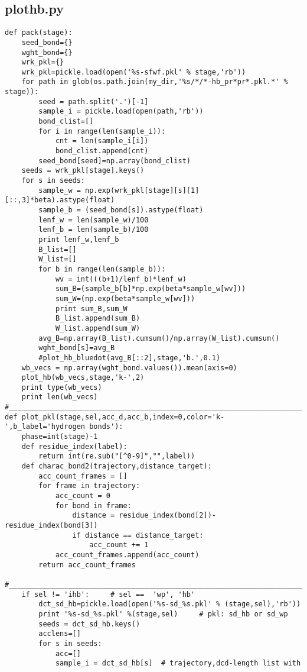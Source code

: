 \documentclass[11pt]{article}
\begin{document}
\subsection{plothb.py}
\begin{verbatim}
def pack(stage):
    seed_bond={}
    wght_bond={}
    wrk_pkl={}
    wrk_pkl=pickle.load(open('%s-sfwf.pkl' % stage,'rb'))
    for path in glob(os.path.join(my_dir,'%s/*/*-hb_pr*pr*.pkl.*' % stage)):
        seed = path.split('.')[-1]
        sample_i = pickle.load(open(path,'rb'))
        bond_clist=[]
        for i in range(len(sample_i)):
            cnt = len(sample_i[i])
            bond_clist.append(cnt)
        seed_bond[seed]=np.array(bond_clist)
    seeds = wrk_pkl[stage].keys()
    for s in seeds:
        sample_w = np.exp(wrk_pkl[stage][s][1][::,3]*beta).astype(float)
        sample_b = (seed_bond[s]).astype(float)
        lenf_w = len(sample_w)/100
        lenf_b = len(sample_b)/100
        print lenf_w,lenf_b
        B_list=[]
        W_list=[]
        for b in range(len(sample_b)):
            wv = int(((b+1)/lenf_b)*lenf_w)
            sum_B=(sample_b[b]*np.exp(beta*sample_w[wv]))
            sum_W=(np.exp(beta*sample_w[wv]))
            print sum_B,sum_W
            B_list.append(sum_B)
            W_list.append(sum_W)
        avg_B=np.array(B_list).cumsum()/np.array(W_list).cumsum()
        wght_bond[s]=avg_B
        #plot_hb_bluedot(avg_B[::2],stage,'b.',0.1)
    wb_vecs = np.array(wght_bond.values()).mean(axis=0)
    plot_hb(wb_vecs,stage,'k-',2)
    print type(wb_vecs)
    print len(wb_vecs)
#____________________________________________________________________________
def plot_pkl(stage,sel,acc_d,acc_b,index=0,color='k-',b_label='hydrogen bonds'):
    phase=int(stage)-1
    def residue_index(label):
        return int(re.sub("[^0-9]","",label))
    def charac_bond2(trajectory,distance_target):
        acc_count_frames = []
        for frame in trajectory:
            acc_count = 0
            for bond in frame:
                distance = residue_index(bond[2])-residue_index(bond[3])
                if distance == distance_target:
                    acc_count += 1
            acc_count_frames.append(acc_count)
        return acc_count_frames
    #_________________________________________________________________________
    if sel != 'ihb':     # sel ==  'wp', 'hb'
        dct_sd_hb=pickle.load(open('%s-sd_%s.pkl' % (stage,sel),'rb'))
        print '%s-sd_%s.pkl' %(stage,sel)     # pkl: sd_hb or sd_wp
        seeds = dct_sd_hb.keys()
        acclens=[]
        for s in seeds:
            acc=[]
            sample_i = dct_sd_hb[s]  # trajectory,dcd-length list with

\end{verbatim}
\end{document}
